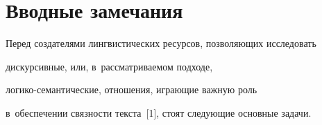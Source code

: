 




 \thispagestyle{headings}





\section{Вводные замечания}





  Перед создателями лингвистических ресурсов, позволяющих исследовать 


дискурсивные, или, в~рассматриваемом подходе, 


 ло\-ги\-ко-се\-ман\-ти\-че\-ские, отношения, играющие важную роль 


в~обеспечении связности текста~[1], стоят следующие основные задачи.


